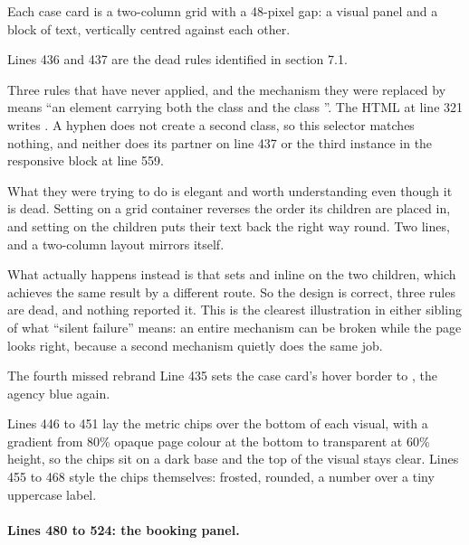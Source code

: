 Each case card is a two-column grid with a 48-pixel gap: a visual panel and a block
of text, vertically centred against each other.

Lines 436 and 437 are the dead rules identified in section 7.1.

\begin{honest}{Three rules that have never applied, and the mechanism they were
replaced by}
 means ``an element carrying both the class
 and the class ''. The HTML at line 321 writes
. A hyphen does not create a second
class, so this selector matches nothing, and neither does its partner on line 437 or
the third instance in the responsive block at line 559.

What they were trying to do is elegant and worth understanding even though it is
dead. Setting  on a grid container reverses the order its
children are placed in, and setting  on the children puts their
text back the right way round. Two lines, and a two-column layout mirrors itself.

What actually happens instead is that  sets  and
 inline on the two children, which achieves the same result by a
different route. So the design is correct, three rules are dead, and nothing
reported it. This is the clearest illustration in either sibling of what ``silent
failure'' means: an entire mechanism can be broken while the page looks right,
because a second mechanism quietly does the same job.
\end{honest}

\begin{honest}{The fourth missed rebrand}
Line 435 sets the case card's hover border to , the agency
blue again.
\end{honest}

Lines 446 to 451 lay the metric chips over the bottom of each visual, with a
gradient from 80\% opaque page colour at the bottom to transparent at 60\% height, so
the chips sit on a dark base and the top of the visual stays clear. Lines 455 to 468
style the chips themselves: frosted, rounded, a number over a tiny uppercase label.

\paragraph{Lines 480 to 524: the booking panel.}

